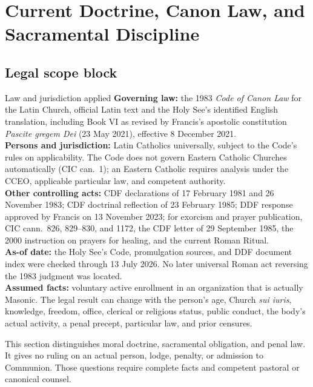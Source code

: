 \section{Current Doctrine, Canon Law, and Sacramental Discipline}

\subsection{Legal scope block}

\begin{massbox}{Law and jurisdiction applied}
\textbf{Governing law:} the 1983 \emph{Code of Canon Law} for the Latin Church, official Latin text and the Holy See's identified English translation, including Book VI as revised by Francis's apostolic constitution \emph{Pascite gregem Dei} (23 May 2021), effective 8 December 2021.\\[0.35em]
\textbf{Persons and jurisdiction:} Latin Catholics universally, subject to the Code's rules on applicability. The Code does not govern Eastern Catholic Churches automatically (CIC can.~1); an Eastern Catholic requires analysis under the CCEO, applicable particular law, and competent authority.\\[0.35em]
\textbf{Other controlling acts:} CDF declarations of 17 February 1981 and 26 November 1983; CDF doctrinal reflection of 23 February 1985; DDF response approved by Francis on 13 November 2023; for exorcism and prayer publication, CIC cann.~826, 829--830, and 1172, the CDF letter of 29 September 1985, the 2000 instruction on prayers for healing, and the current Roman Ritual.\\[0.35em]
\textbf{As-of date:} the Holy See's Code, promulgation sources, and DDF document index were checked through 13 July 2026. No later universal Roman act reversing the 1983 judgment was located.\\[0.35em]
\textbf{Assumed facts:} voluntary active enrollment in an organization that is actually Masonic. The legal result can change with the person's age, Church \emph{sui iuris}, knowledge, freedom, office, clerical or religious status, public conduct, the body's actual activity, a penal precept, particular law, and prior censures.
\end{massbox}

\enlargethispage{\baselineskip}
This section distinguishes moral doctrine, sacramental obligation, and penal law. It gives no ruling on an actual person, lodge, penalty, or admission to Communion. Those questions require complete facts and competent pastoral or canonical counsel.

